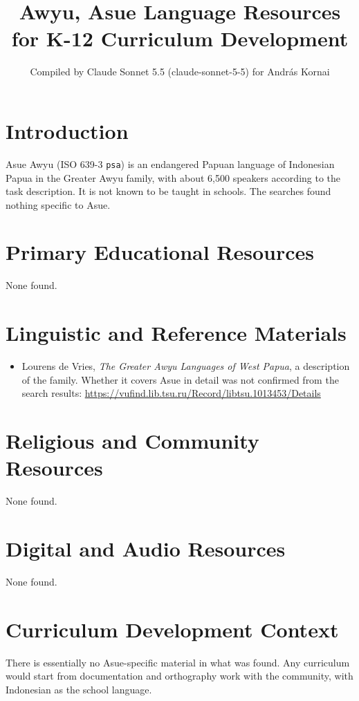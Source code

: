 \documentclass[12pt]{article}
\title{Awyu, Asue Language Resources for K-12 Curriculum Development}
\author{Compiled by Claude Sonnet 5.5 (claude-sonnet-5-5) for Andr\'as Kornai}
\date{}
\begin{document}
\maketitle

\section{Introduction}
Asue Awyu (ISO 639-3 \texttt{psa}) is an endangered Papuan language of Indonesian Papua in the Greater Awyu family, with about 6,500 speakers according to the task description. It is not known to be taught in schools. The searches found nothing specific to Asue.

\section{Primary Educational Resources}
None found.

\section{Linguistic and Reference Materials}
\begin{itemize}
\item Lourens de Vries, \emph{The Greater Awyu Languages of West Papua}, a description of the family. Whether it covers Asue in detail was not confirmed from the search results: \url{https://vufind.lib.tsu.ru/Record/libtsu.1013453/Details}
\end{itemize}

\section{Religious and Community Resources}
None found.

\section{Digital and Audio Resources}
None found.

\section{Curriculum Development Context}
There is essentially no Asue-specific material in what was found. Any curriculum would start from documentation and orthography work with the community, with Indonesian as the school language.
\end{document}
